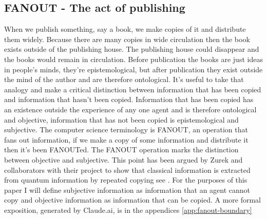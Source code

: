 \subsection{FANOUT - The act of publishing}
\label{sec:fanout-boundary}
When we publish something, say a book,  we make copies of it and distribute them widely. Because there are many copies in wide circulation then the book exists outside of the publishing house. The publishing house could disappear and the books would remain in circulation. Before publication the books are just ideas in people's minds, they're epistemological, but after publication they exist outside the mind of the author and are therefore ontological. It's useful to take that analogy and make a critical distinction between information that has been copied and information that hasn't been copied. Information that has been copied has an existence outside the experience of any one agent and is therefore ontological and objective, information that has not been copied is epistemological and subjective. The computer science terminology is FANOUT, an operation that fans out information, if we make a copy of some information and distribute it then it's been FANOUTed. The FANOUT operation marks the distinction between objective and subjective. This point has been argued by Zurek and collaborators with their project to show that classical information is extracted from quantum information by repeated copying see \autocite{zurek_2009, Zurek2002, Oliver_2004}. For the purposes of this paper I will define subjective information as information that an agent cannot copy and objective information as information that can be copied. A more formal exposition, generated by Claude.ai, is in the appendices \ref{app:fanout-boundary}

